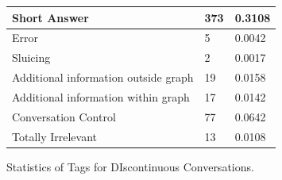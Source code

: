 \documentclass[bsc,frontabs,twoside,singlespacing,parskip,deptreport]{infthesis}     %
\begin{document}
\begin{minipage}{\textwidth}
\begin{minipage}[t]{0.45\textwidth}
{\begin{tabular}{|l|l|l|}
Short Answer                         & 373    & 0.3108                    \\ \hline
Error                                & 5      & 0.0042                    \\ \hline
Sluicing                             & 2      & 0.0017                    \\ \hline
Additional information outside graph & 19     & 0.0158                    \\ \hline
Additional information within graph  & 17     & 0.0142                    \\ \hline
Conversation Control                 & 77     & 0.0642                    \\ \hline
Totally Irrelevant                   & 13     & 0.0108                    \\ \hline
\end{tabular}%
}
\caption{Statistics of Tags for DIscontinuous  Conversations.}
\label{tab:dis}
        \end{minipage}
    \end{minipage}
\end{document}
